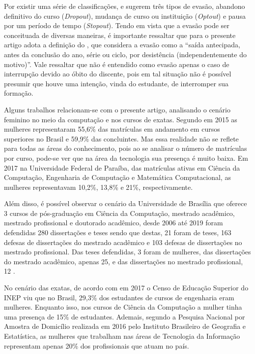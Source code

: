 \documentclass[a4paper]{article}
\begin{document}
Por existir uma série de classificações,  e  sugerem três tipos de evasão, abandono definitivo do curso (\textit{Dropout}), mudança de curso ou instituição (\textit{Optout}) e pausa por um período de tempo (\textit{Stopout}). Tendo em vista que a evasão pode ser conceituada de diversas maneiras, é importante ressaltar que para o presente artigo adota a definição do , que considera a evasão como a ``saída antecipada, antes da conclusão do ano, série ou ciclo, por desistência (independentemente do motivo)''. Vale ressaltar que não é entendido como evasão apenas o caso de interrupção devido ao óbito do discente, pois em tal situação não é possível presumir que houve uma intenção, vinda do estudante, de interromper sua formação.





Alguns trabalhos relacionam-se com o presente artigo, analisando o cenário feminino no meio da computação e nos cursos de exatas. Segundo  em 2015 as mulheres representaram 55,6\% das matrículas em andamento em cursos superiores no Brasil e 59,9\% das concluintes. Mas essa realidade não se reflete para todas as áreas do conhecimento, pois ao se analisar o número de matrículas por  curso, pode-se ver que na área da tecnologia sua presença é muito baixa. Em 2017 na Universidade Federal de Paraíba, das matrículas ativas em Ciência da Computação, Engenharia de Computação e Matemática Computacional, as mulheres representavam 10,2\%, 13,8\% e 21\%, respectivamente.
    
Além disso, é possível observar o cenário da Universidade de Brasília que oferece 3 cursos de pós-graduação em Ciência da Computação, mestrado acadêmico, mestrado profissional e doutorado acadêmico, desde 2006 até 2019 foram defendidas 280 dissertações e teses sendo que destas, 21 foram de teses, 163 defesas de dissertações do mestrado acadêmico e 103 defesas de dissertações no mestrado profissional. Das teses defendidas, 3 foram de mulheres, das dissertações do mestrado acadêmico, apenas 25, e das dissertações no mestrado profissional, 12 \cite{holanda:2019}.
    
No cenário das exatas, de acordo com  em 2017 o Censo de Educação Superior do INEP viu que no Brasil, 29,3\% dos estudantes de cursos de engenharia eram mulheres. Enquanto isso, nos cursos de Ciência da Computação a mulher tinha uma presença de 15\% de estudantes. Ademais, segundo a Pesquisa Nacional por Amostra de Domicílio realizada em 2016 pelo Instituto Brasileiro de Geografia e Estatística, as mulheres que trabalham nas áreas de Tecnologia da Informação representam apenas 20\% dos profissionais que atuam no país.
\end{document}
